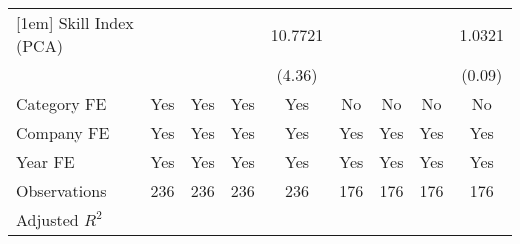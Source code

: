 {\begin{tabular}{l*{8}{c}}
[1em]
Skill Index (PCA)                  &                     &                     &                     &     10.7721\sym{***}&                     &                     &                     &      1.0321         \\
                                   &                     &                     &                     &      (4.36)         &                     &                     &                     &      (0.09)         \\
[1em]
Category FE                        &         Yes         &         Yes         &         Yes         &         Yes         &          No         &          No         &          No         &          No         \\
[1em]
Company FE                         &         Yes         &         Yes         &         Yes         &         Yes         &         Yes         &         Yes         &         Yes         &         Yes         \\
[1em]
Year FE                            &         Yes         &         Yes         &         Yes         &         Yes         &         Yes         &         Yes         &         Yes         &         Yes         \\
\hline
Observations                       &         236         &         236         &         236         &         236         &         176         &         176         &         176         &         176         \\
Adjusted \(R^{2}\)                 &                     &                     &                     &                     &                     &                     &                     &                     \\
\hline\hline
\end{tabular}
}
